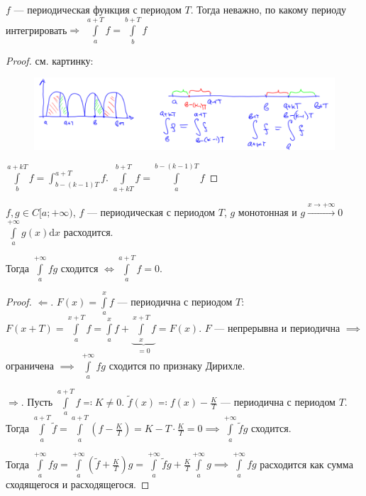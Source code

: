 \begin{statement}
    $f$ --- периодическая функция с периодом  $T$. Тогда неважно, по какому периоду интегрировать$\Rightarrow$ $\int\limits_a^{a+T} f = \int\limits_b^{b+T}f$ 
\end{statement}
\begin{proof}
    см. картинку:\\
    \begin{figure}[h!]
        \includegraphics[scale=0.6]{abels_consequence}
    \end{figure}
    
    $\int\limits_b^{a+kT}f = \int_{b-(k-1)T}^{a+T}f$.  $\int\limits_{a+kT}^{b+T} f = \int\limits_{a}^{b-(k-1)T} f$
\end{proof}
\newpage
\begin{consequence}
   $f, g\in C[a;+\infty)$,  $f$ --- периодическая с периодом  $T$,  $g$ монотонная и $g \xrightarrow{x \to +\infty} 0$  $\int\limits_a^{+\infty} g(x) \mathrm{d}x$ расходится. 

   Тогда $\int\limits_a^{+\infty} fg$ сходится  $\iff \int\limits_a^{a+T} f = 0$.
\end{consequence}
\begin{proof}
    $\Leftarrow$.  $F(x) = \int\limits_a^x f$ --- периодична с периодом  $T$:\\
    $F(x+T) = \int\limits_a^{x+T} f = \int\limits_a^x f + \underbrace{\int\limits_x^{x+T}f}_{=0} = F(x)$.  $F$ --- непрерывна и периодична  $\implies$ ограничена  $\implies$  $\int\limits_a^{+\infty} fg$ сходится по признаку Дирихле.

    $\Rightarrow$. Пусть  $\int\limits_a^{a+T} f \eqqcolon K \neq 0$.  $\widetilde{f}(x) \eqqcolon f(x) - \frac{K}{T}$ --- периодична с периодом $T$. Тогда  $\int\limits_a^{a+T} \widetilde{f} = \int\limits_a^{a+T}(f-\frac{K}{T}) = K - T \cdot \frac{K}{T} = 0 \implies \int\limits_a^{+\infty} \widetilde{f}g$ сходится.

    Тогда $\int\limits_a^{+\infty} fg = \int\limits_a^{+\infty}(\widetilde{f} + \frac{K}{T})g = \int\limits_a^{+\infty} \widetilde{f}g + \frac{K}{T}\int\limits_a^{+\infty} g \implies \int\limits_a^{+\infty} fg$ расходится как сумма сходящегося и расходящегося. 
\end{proof}
